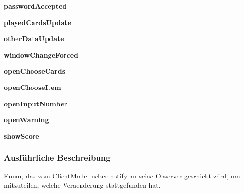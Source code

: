 \begin{DoxyCompactItemize}
\item 
\hypertarget{a00024_a10126f0d7ab34818a6fcac72e0834f54}{{\bfseries password\-Accepted}}\label{a00024_a10126f0d7ab34818a6fcac72e0834f54}

\item 
\hypertarget{a00024_aaf6d6355be04b40a09ef226c86bf8659}{{\bfseries played\-Cards\-Update}}\label{a00024_aaf6d6355be04b40a09ef226c86bf8659}

\item 
\hypertarget{a00024_a8ae442eff1cd0550d1d97f86d71fd02e}{{\bfseries other\-Data\-Update}}\label{a00024_a8ae442eff1cd0550d1d97f86d71fd02e}

\item 
\hypertarget{a00024_aa10538b6b27362eecff8ef433b1d14c6}{{\bfseries window\-Change\-Forced}}\label{a00024_aa10538b6b27362eecff8ef433b1d14c6}

\item 
\hypertarget{a00024_a874f70629715c6d24776db50c34547e9}{{\bfseries open\-Choose\-Cards}}\label{a00024_a874f70629715c6d24776db50c34547e9}

\item 
\hypertarget{a00024_a70960eb2d8a55fd73166c3d7975fbb70}{{\bfseries open\-Choose\-Item}}\label{a00024_a70960eb2d8a55fd73166c3d7975fbb70}

\item 
\hypertarget{a00024_a8aa5232ad1888872984b3608cfb74705}{{\bfseries open\-Input\-Number}}\label{a00024_a8aa5232ad1888872984b3608cfb74705}

\item 
\hypertarget{a00024_a2fba94db10d6b57caf70c532f16d118f}{{\bfseries open\-Warning}}\label{a00024_a2fba94db10d6b57caf70c532f16d118f}

\item 
\hypertarget{a00024_ac2a087bbbdc94e296fc84945a704898e}{{\bfseries show\-Score}}\label{a00024_ac2a087bbbdc94e296fc84945a704898e}

\end{DoxyCompactItemize}


\subsubsection{Ausführliche Beschreibung}
Enum, das vom \hyperlink{a00003}{Client\-Model} ueber notify an seine Observer geschickt wird, um mitzuteilen, welche Veraenderung stattgefunden hat. 